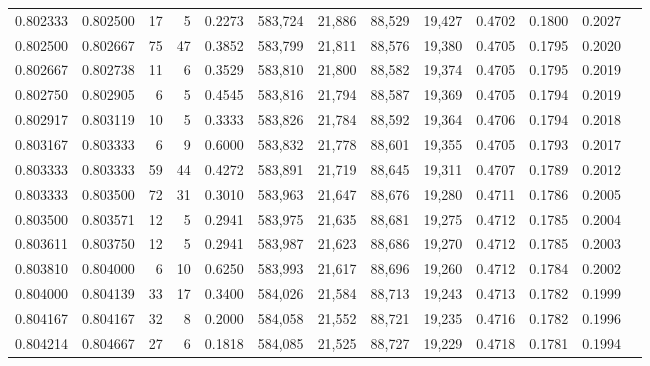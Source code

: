 \begin{tabular}{rrrrrrrrrrrrr}
0.802333 & 0.802500 &    17 &   5 &                                     0.2273 & 583,724 &  21,886 &  88,529 &  19,427 & 0.4702 & 0.1800 & 0.2027 \\
0.802500 & 0.802667 &    75 &  47 &                                     0.3852 & 583,799 &  21,811 &  88,576 &  19,380 & 0.4705 & 0.1795 & 0.2020 \\
0.802667 & 0.802738 &    11 &   6 &                                     0.3529 & 583,810 &  21,800 &  88,582 &  19,374 & 0.4705 & 0.1795 & 0.2019 \\
0.802750 & 0.802905 &     6 &   5 &                                     0.4545 & 583,816 &  21,794 &  88,587 &  19,369 & 0.4705 & 0.1794 & 0.2019 \\
0.802917 & 0.803119 &    10 &   5 &                                     0.3333 & 583,826 &  21,784 &  88,592 &  19,364 & 0.4706 & 0.1794 & 0.2018 \\
0.803167 & 0.803333 &     6 &   9 &                                     0.6000 & 583,832 &  21,778 &  88,601 &  19,355 & 0.4705 & 0.1793 & 0.2017 \\
0.803333 & 0.803333 &    59 &  44 &                                     0.4272 & 583,891 &  21,719 &  88,645 &  19,311 & 0.4707 & 0.1789 & 0.2012 \\
0.803333 & 0.803500 &    72 &  31 &                                     0.3010 & 583,963 &  21,647 &  88,676 &  19,280 & 0.4711 & 0.1786 & 0.2005 \\
0.803500 & 0.803571 &    12 &   5 &                                     0.2941 & 583,975 &  21,635 &  88,681 &  19,275 & 0.4712 & 0.1785 & 0.2004 \\
0.803611 & 0.803750 &    12 &   5 &                                     0.2941 & 583,987 &  21,623 &  88,686 &  19,270 & 0.4712 & 0.1785 & 0.2003 \\
0.803810 & 0.804000 &     6 &  10 &                                     0.6250 & 583,993 &  21,617 &  88,696 &  19,260 & 0.4712 & 0.1784 & 0.2002 \\
0.804000 & 0.804139 &    33 &  17 &                                     0.3400 & 584,026 &  21,584 &  88,713 &  19,243 & 0.4713 & 0.1782 & 0.1999 \\
0.804167 & 0.804167 &    32 &   8 &                                     0.2000 & 584,058 &  21,552 &  88,721 &  19,235 & 0.4716 & 0.1782 & 0.1996 \\
0.804214 & 0.804667 &    27 &   6 &                                     0.1818 & 584,085 &  21,525 &  88,727 &  19,229 & 0.4718 & 0.1781 & 0.1994 \\

\end{tabular}
